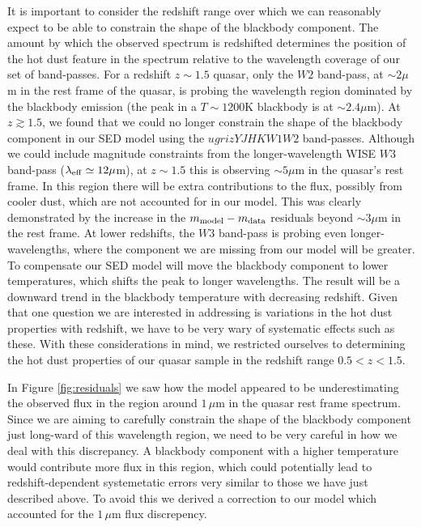 It is important to consider the redshift range over which we can reasonably expect to be able to constrain the shape of the blackbody component. The amount by which the observed spectrum is redshifted determines the position of the hot dust feature in the spectrum relative to the wavelength coverage of our set of band-passes. For a redshift $z \sim 1.5$ quasar, only the $W2$ band-pass, at $\sim 2 \mu$m in the rest frame of the quasar, is probing the wavelength region dominated by the blackbody emission (the peak in a $T \sim 1200$K blackbody is at $\sim 2.4 \mu$m). At $z \gtrsim 1.5$, we found that we could no longer constrain the shape of the blackbody component in our SED model using the $ugrizYJHKW1W2$ band-passes. Although we could include magnitude constraints from the longer-wavelength WISE $W3$ band-pass ($\lambda_{\rm eff} \simeq 12 \mu$m), at $z \sim 1.5$ this is observing $\sim 5 \mu$m in the quasar's rest frame. In this region there will be extra contributions to the flux, possibly from cooler dust, which are not accounted for in our model. This was clearly demonstrated by the increase in the $m_{\rm model} - m_{\rm data}$ residuals beyond $\sim 3\mu$m in the rest frame. At lower redshifts, the $W3$ band-pass is probing even longer-wavelengths, where the component we are missing from our model will be greater. To compensate our SED model will move the blackbody component to lower temperatures, which shifts the peak to longer wavelengths. The result will be a downward trend in the blackbody temperature with decreasing redshift. Given that one question we are interested in addressing is variations in the hot dust properties with redshift, we have to be very wary of systematic effects such as these. With these considerations in mind, we restricted ourselves to determining the hot dust properties of our quasar sample in the redshift range $0.5 < z < 1.5$. 

In Figure \ref{fig:residuals} we saw how the model appeared to be underestimating the observed flux in the region around $1\,\mu$m in the quasar rest frame spectrum. Since we are aiming to carefully constrain the shape of the blackbody component just long-ward of this wavelength region, we need to be very careful in how we deal with this discrepancy. A blackbody component with a higher temperature would contribute more flux in this region, which could potentially lead to redshift-dependent systemetatic errors very similar to those we have just described above. To avoid this we derived a correction to our model which accounted for the $1\,\mu$m flux discrepency. 


